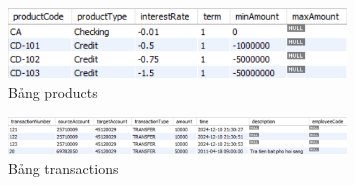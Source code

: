 \begin{enumerate}[label=\alph*.]
    \begin{figure}[H]
        \centering
        \includegraphics[width=0.8\textwidth]{sample-products.png}
        \caption{Bảng products}
    \end{figure}

    \begin{figure}[H]
        \centering
        \includegraphics[width=0.8\textwidth]{sample-transactions.png}
        \caption{Bảng transactions}
    \end{figure}

\end{enumerate}
